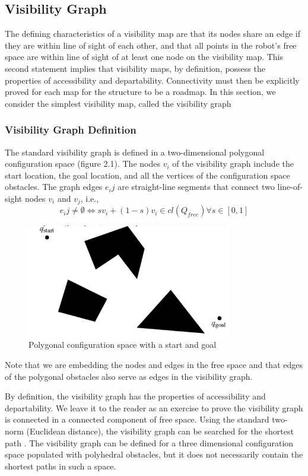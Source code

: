 \documentclass[11pt]{article}
\begin{document}
\subsection{Visibility Graph}

The defining characteristics of a visibility map are that its nodes share an edge if they are within line of sight of each other, and that all points in the robot's free space are within line of sight of at least one node on the visibility map. This second statement implies that visibility maps, by definition, possess the properties of accessibility and departability. Connectivity must then be explicitly proved for each map for the structure to be a roadmap. In this section, we consider the simplest visibility map, called the visibility graph

\subsubsection{Visibility Graph Definition}


The standard visibility graph is defined in a two-dimensional polygonal configuration space (figure 2.1). The nodes $v_i$ of the visibility graph include the start location, the goal location, and all the vertices of the configuration space obstacles. The graph edges $e_ij$ are straight-line segments that connect two line-of-sight nodes $v_i$ and $v_j$, i.e.,
$$e_ij \ne \emptyset \Longleftrightarrow sv_i + (1-s)v_i \in cl(Q_{free})   \forall s \in [0,1] $$
\begin{figure}[h]
\centering
\includegraphics[width=9cm]{imgs/Polygonal_configuration_space.png}
\caption{Polygonal configuration space with a start and goal}
\end{figure}

Note that we are embedding the nodes and edges in the free space and that edges of the polygonal obstacles also serve as edges in the visibility graph.

By definition, the visibility graph has the properties of accessibility and departability. We leave it to the reader as an exercise to prove the visibility graph is connected in a connected component of free space. Using the standard two-norm (Euclidean distance), the visibility graph can be searched for the shortest path . The visibility graph can be defined for a three dimensional configuration space populated with polyhedral obstacles, but it does not necessarily contain the shortest paths in such a space.\\
\end{document}
